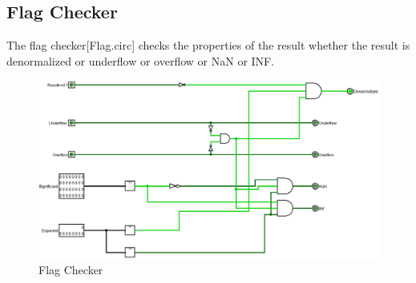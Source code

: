 \documentclass[a4paper,12pt]{article}
\begin{document}
\subsection{Flag Checker}
The flag checker[Flag.circ] checks the properties of the result whether the
result is denormalized or underflow or overflow or NaN or INF.

\begin{figure}[H]
    \centering
    \includegraphics[width=1\textwidth]{Flag.png}
    \caption{Flag Checker}
    \label{Flag}
\end{figure}
\end{document}
